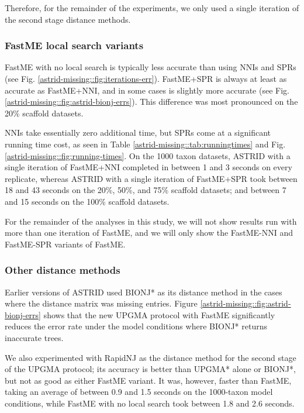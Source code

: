 Therefore, for the remainder of the experiments, we only used a single iteration of the second stage distance methods.



\subsubsection{FastME local search variants}

FastME with no local search is typically less accurate than using NNIs and SPRs (see Fig. \ref{astrid-missing::fig:iterations-err}). FastME+SPR is always at least as accurate as FastME+NNI, and in some cases is slightly more accurate (see Fig. \ref{astrid-missing::fig:astrid-bionj-errs}). This difference was most pronounced on the 20\% scaffold datasets.

NNIs take essentially zero additional time, but SPRs come at a significant running time cost, as seen in Table \ref{astrid-missing::tab:runningtimes} and Fig. \ref{astrid-missing::fig:running-times}. On the 1000 taxon datasets,  ASTRID with a single iteration of FastME+NNI completed in between 1 and 3 seconds on every replicate, whereas ASTRID with a single iteration of FastME+SPR took between 18 and 43 seconds on the 20\%, 50\%, and 75\% scaffold datasets; and between 7 and 15 seconds on the 100\% scaffold datasets.

For the remainder of the analyses in this study, we will not show results run with more than one iteration of FastME, and we will only show the FastME-NNI and FastME-SPR variants of FastME.


\subsubsection{Other distance methods}

Earlier versions of ASTRID used BIONJ* as its distance method in the cases where the distance matrix was missing entries. Figure \ref{astrid-missing::fig:astrid-bionj-errs} shows that the new UPGMA protocol with FastME significantly reduces the error rate under the model conditions where BIONJ* returns inaccurate trees.

We also experimented with RapidNJ as the distance method for the second stage of the UPGMA protocol; its accuracy is better than UPGMA* alone or BIONJ*, but not as good as either FastME variant. It was, however, faster than FastME, taking an average of between 0.9 and 1.5 seconds on the 1000-taxon model conditions, while FastME with no local search took between 1.8 and 2.6 seconds.

